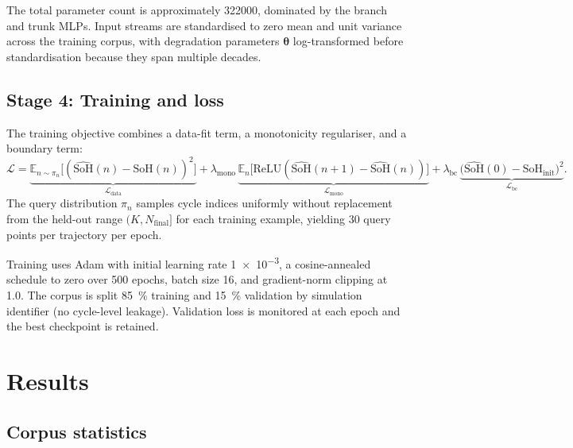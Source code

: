 \documentclass[preprint,12pt,3p,authoryear]{elsarticle}
\begin{document}
The total parameter count is approximately \num{322000}, dominated by
the branch and trunk MLPs. Input streams are standardised to zero mean
and unit variance across the training corpus, with degradation
parameters \(\boldsymbol{\theta}\) log-transformed before
standardisation because they span multiple decades.

\subsection{Stage 4: Training and loss}
\label{sec:methods:training}

The training objective combines a data-fit term, a monotonicity
regulariser, and a boundary term:
\begin{equation}
    \mathcal{L} = \underbrace{\mathbb{E}_{n \sim \pi_n}\bigl[
    (\widehat{\text{SoH}}(n) - \text{SoH}(n))^2\bigr]}_{\mathcal{L}_\text{data}}
    + \lambda_\text{mono}\,\underbrace{\mathbb{E}_n\bigl[
    \text{ReLU}(\widehat{\text{SoH}}(n{+}1) -
    \widehat{\text{SoH}}(n))\bigr]}_{\mathcal{L}_\text{mono}}
    + \lambda_\text{bc}\,\underbrace{\bigl(\widehat{\text{SoH}}(0) -
    \text{SoH}_\text{init}\bigr)^2}_{\mathcal{L}_\text{bc}}.
\end{equation}
The query distribution \(\pi_n\) samples cycle indices uniformly
without replacement from the held-out range \((K, N_\text{final}]\) for
each training example, yielding \num{30} query points per trajectory per
epoch.

Training uses Adam with initial learning rate \num{1e-3}, a cosine-annealed
schedule to zero over \num{500} epochs, batch size \num{16}, and
gradient-norm clipping at \num{1.0}. The corpus is split \qty{85}{\percent}
training and \qty{15}{\percent} validation by simulation identifier
(no cycle-level leakage). Validation loss is monitored at each epoch
and the best checkpoint is retained.

\section{Results}
\label{sec:results}

\subsection{Corpus statistics}
\label{sec:results:corpus}
\end{document}
